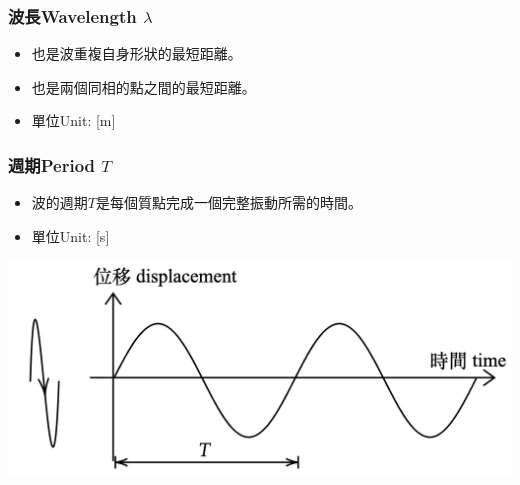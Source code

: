 \documentclass[beamer=true]{standalone}
\begin{document}
\begin{frame}
    \frametitle{波長Wavelength $\lambda$}

    \begin{itemize}
        \item 也是波重複自身形狀的最短距離。
        \item 也是兩個同相的點之間的最短距離。
        \item 單位Unit: [m]
    \end{itemize}
\end{frame}

\begin{frame}
    \frametitle{週期Period $T$}
    \begin{itemize}
        \item 波的週期$T$是每個質點完成一個完整振動所需的時間。
        \item 單位Unit: [s]
    \end{itemize}
    \bigskip\par{\par\centering\includegraphics[width=.7\textwidth]{./img/ch1_2024-05-07-18-12-56.png}\par}
\end{frame}
\end{document}
